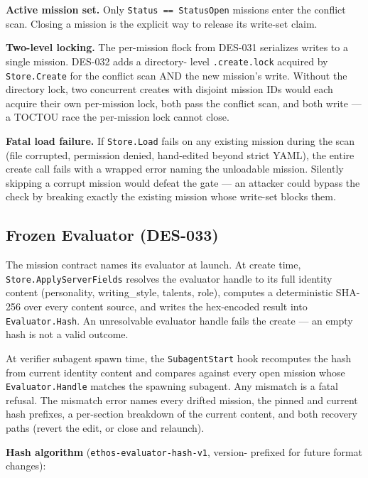 \documentclass[a4paper,10pt]{article}
\newcommand{\field}[1]{\texttt{#1}}
\newcommand{\fpath}[1]{\texttt{#1}}
\begin{document}
\textbf{Active mission set.}  Only \texttt{Status == StatusOpen}
missions enter the conflict scan.  Closing a mission is the explicit
way to release its write-set claim.

\textbf{Two-level locking.}  The per-mission flock from DES-031
serializes writes to a single mission.  DES-032 adds a directory-
level \fpath{.create.lock} acquired by \texttt{Store.Create} for the
conflict scan AND the new mission's write.  Without the directory
lock, two concurrent creates with disjoint mission IDs would each
acquire their own per-mission lock, both pass the conflict scan, and
both write --- a TOCTOU race the per-mission lock cannot close.

\textbf{Fatal load failure.}  If \texttt{Store.Load} fails on any
existing mission during the scan (file corrupted, permission denied,
hand-edited beyond strict YAML), the entire create call fails with a
wrapped error naming the unloadable mission.  Silently skipping a
corrupt mission would defeat the gate --- an attacker could bypass
the check by breaking exactly the existing mission whose write-set
blocks them.

\subsection{Frozen Evaluator (DES-033)}

The mission contract names its evaluator at launch.  At create time,
\texttt{Store.ApplyServerFields} resolves the evaluator handle to its
full identity content (personality, writing\_style, talents, role),
computes a deterministic SHA-256 over every content source, and
writes the hex-encoded result into \field{Evaluator.Hash}.  An
unresolvable evaluator handle fails the create --- an empty hash is
not a valid outcome.

At verifier subagent spawn time, the \texttt{SubagentStart} hook
recomputes the hash from current identity content and compares
against every open mission whose \field{Evaluator.Handle} matches
the spawning subagent.  Any mismatch is a fatal refusal.  The
mismatch error names every drifted mission, the pinned and current
hash prefixes, a per-section breakdown of the current content, and
both recovery paths (revert the edit, or close and relaunch).

\textbf{Hash algorithm} (\texttt{ethos-evaluator-hash-v1}, version-
prefixed for future format changes):
\end{document}
